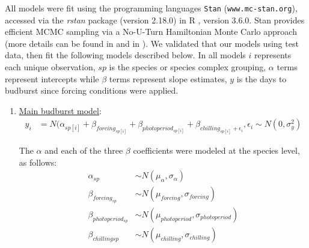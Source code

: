 \documentclass{article}
\begin{document}
\par All models were fit using the programming languages \texttt{Stan} \citep{Carpenter:2016aa}(\texttt{www.mc-stan.org}), accessed via the \textit{rstan} package (version 2.18.0) in R \citep{Rcore:2017,rstan2018}, version 3.6.0. Stan provides efficient MCMC sampling via a No-U-Turn Hamiltonian Monte Carlo approach (more details can be found in \citet{BDA} and in \citet{Carpenter:2016aa}). We validated that our models using test data, then fit the following models described below. In all models $i$ represents each unique observation, $sp$ is the species or species complex grouping, $\alpha$ terms represent intercepts while $\beta$ terms represent slope estimates, $y$ is the days to budburst since forcing conditions were applied.  
\begin{enumerate}
\item \underline{Main budburst model}:
\begin{align*}
y_i &= N(\alpha_{sp[i]} + \beta_{forcing_{sp[i]}} + \beta_{photoperiod_{sp[i]}} + \beta_{chilling_{sp[i]} + \epsilon_i}, \epsilon_i \sim N(0,\sigma^2_y)
\end{align*}

\noindent The $\alpha$ and each of the three $\beta$ coefficients were modeled at the species level, as follows:
\begin{align*}
\alpha_{sp} & \sim N(\mu_{\alpha}, \sigma_{\alpha}) \\
\beta_{forcing_{sp}} & \sim N(\mu_{forcing}, \sigma_{forcing}) \\
\beta_{photoperiod_{sp}} & \sim N(\mu_{photoperiod}, \sigma_{photoperiod})\\
\beta_{chilling{sp}} & \sim N(\mu_{chilling}, \sigma_{chilling})
\end{align*}


\end{enumerate}
\end{document}
